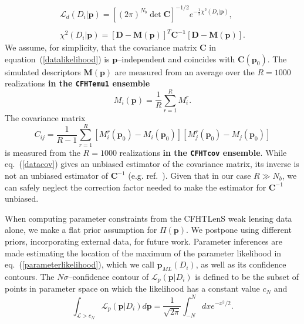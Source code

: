 \documentclass[reprint,aps,prd,superscriptaddress,showkeys,showpacs]{revtex4-1}
\begin{document}
\begin{equation}
\label{datalikelihood}
\begin{matrix}
\mathcal{L}_d(D_i\vert \mathbf{p}) = [(2\pi)^{N_b}\det{\mathbf{C}}]^{-1/2} e^{-\frac{1}{2}\chi^2(D_i\vert \mathbf{p})}, \\ \\
\chi^2(D_i\vert \mathbf{p}) = \mathbf{[D - M(p)]}^T\mathbf{C^{-1}[D-M(p)]}.
\end{matrix}
\end{equation} 
We assume, for simplicity, that the covariance matrix $\mathbf{C}$ in
equation~(\ref{datalikelihood}) is $\mathbf{p}$--independent and
coincides with $\mathbf{C}(\mathbf{p}_0)$. The simulated descriptors $\mathbf{M(p)}$ are
measured from an average over the $R=1000$ realizations \textbf{in the \texttt{CFHTemu1} ensemble}  
\begin{equation}
M_i(\mathbf{p}) = \frac{1}{R}\sum_{r=1}^R M_i^r .
\end{equation}
The covariance matrix 
\begin{equation}
\label{datacov}
C_{ij} = \frac{1}{R-1} \sum_{r=1}^R [M_i^r(\mathbf{p}_0)-M_i(\mathbf{p}_0)][M_j^r(\mathbf{p}_0)-M_j(\mathbf{p}_0)]
\end{equation}
is measured from the \textbf{$R=1000$} realizations \textbf{in the \texttt{CFHTcov} ensemble}.
While eq.~(\ref{datacov}) gives an unbiased estimator of the
covariance matrix, its inverse is not an unbiased estimator of
$\mathbf{C}^{-1}$ (e.g. ref.~\citep{RayTracingHartlap}). Given that in
our case $R\gg N_b$, we can safely neglect the correction factor
needed to make the estimator for $\mathbf{C}^{-1}$ unbiased.

When computing parameter constraints from the CFHTLenS weak lensing
data alone, we make a flat prior assumption for $\Pi(\mathbf{p})$.  We
postpone using different priors, incorporating external data, for
future work. Parameter inferences are made estimating the location of
the maximum of the parameter likelihood in
eq.~(\ref{parameterlikelihood}), which we call $\mathbf{p}_{ML}(D_i)$,
as well as its confidence contours. The $N\sigma$--confidence contour
of $\mathcal{L}_p(\mathbf{p}\vert D_i)$ is defined to be the subset of
points in parameter space on which the likelihood has a constant value
$c_N$ and
\begin{equation}
\label{ennesigma}
\int_{\mathcal{L}>c_N} \mathcal{L}_p(\mathbf{p}\vert D_i) d\mathbf{p} = \frac{1}{\sqrt{2\pi}}\int_{-N}^N dx e^{-x^2/2}.
\end{equation}
\end{document}
